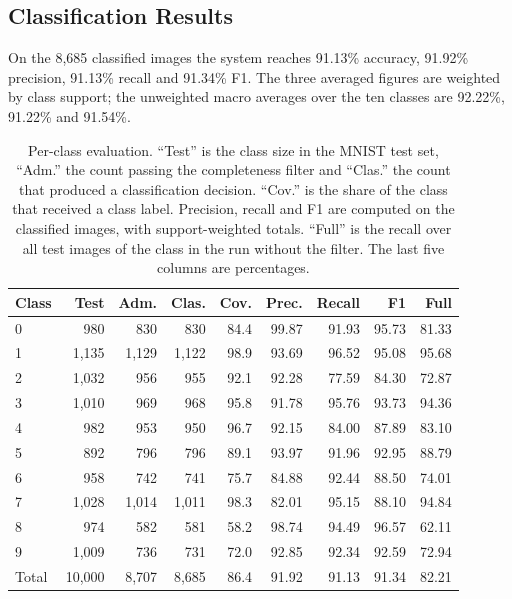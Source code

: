 \subsection{Classification Results}

On the 8,685 classified images the system reaches 91.13\% accuracy,
91.92\% precision, 91.13\% recall and 91.34\% F1. The three averaged
figures are weighted by class support; the unweighted macro averages over the
ten classes are 92.22\%, 91.22\% and 91.54\%.

\begin{table}[t]
\caption{Per-class evaluation. ``Test'' is the class size in the MNIST test
set, ``Adm.'' the count passing the completeness filter and ``Clas.'' the count
that produced a classification decision. ``Cov.'' is the share of the class
that received a class label. Precision, recall and F1 are computed on the
classified images, with support-weighted totals. ``Full'' is the recall over
all test images of the class in the run without the filter. The last five
columns are percentages.}
\label{tab:perclass}
\centering
\footnotesize
\setlength{\tabcolsep}{2.5pt}
\begin{tabular}{@{}lrrrrrrrr@{}}
\toprule
Class & Test & Adm. & Clas. & Cov. & Prec. & Recall & F1 & Full \\
\midrule
0     & 980    & 830   & 830   & 84.4 & 99.87 & 91.93 & 95.73 & 81.33 \\
1     & 1,135  & 1,129 & 1,122 & 98.9 & 93.69 & 96.52 & 95.08 & 95.68 \\
2     & 1,032  & 956   & 955   & 92.1 & 92.28 & 77.59 & 84.30 & 72.87 \\
3     & 1,010  & 969   & 968   & 95.8 & 91.78 & 95.76 & 93.73 & 94.36 \\
4     & 982    & 953   & 950   & 96.7 & 92.15 & 84.00 & 87.89 & 83.10 \\
5     & 892    & 796   & 796   & 89.1 & 93.97 & 91.96 & 92.95 & 88.79 \\
6     & 958    & 742   & 741   & 75.7 & 84.88 & 92.44 & 88.50 & 74.01 \\
7     & 1,028  & 1,014 & 1,011 & 98.3 & 82.01 & 95.15 & 88.10 & 94.84 \\
8     & 974    & 582   & 581   & 58.2 & 98.74 & 94.49 & 96.57 & 62.11 \\
9     & 1,009  & 736   & 731   & 72.0 & 92.85 & 92.34 & 92.59 & 72.94 \\
\midrule
Total & 10,000 & 8,707 & 8,685 & 86.4 & 91.92 & 91.13 & 91.34 & 82.21 \\
\bottomrule
\end{tabular}
\end{table}

